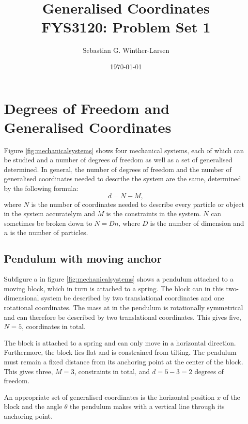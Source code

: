 \documentclass[11pt]{amsart}
\title[FYS3120: Problem Set 1]{Generalised Coordinates \\ \hrulefill\small{ FYS3120: Problem Set 1 }\hrulefill}
\author{Sebastian G. Winther-Larsen}
\date{\today}
\newcommand{\nocontentsline}[3]{}
\newcommand{\tocless}[2]{\bgroup\let\addcontentsline=\nocontentsline#1{#2}\egroup}
\begin{document}
\maketitle

\tableofcontents

\section{Degrees of Freedom and Generalised Coordinates}

Figure \ref{fig:mechanicalsystems} shows four mechanical systems, each of which can be studied and a number of degrees of freedom as well as a set of generalised determined. In general, the number of degrees of freedom and the number of generalised coordinates needed to describe the system are the same, determined by the following formula:
\begin{equation}
\label{eq:dof}
d = N - M,
\end{equation}
where $N$ is the number of coordinates needed to describe every particle or object in the system accuratelym and $M$ is the constraints in the system. $N$ can sometimes be broken down to $N = Dn$, where $D$ is the number of dimension and $n$ is the number of particles.

\tocless\subsection{Pendulum with moving anchor}
Subfigure a in figure \ref{fig:mechanicalsystems} shows a pendulum attached to a moving block, which in turn is attached to a spring. The block can in this two-dimensional system be described by two translational coordinates and one rotational coordinates. The mass at in the pendulum is rotationally symmetrical and can therefore be described by two translational coordinates. This gives five, $N=5$, coordinates in total. 

The block is attached to a spring and can only move in a horizontal direction. Furthermore, the block lies flat and is constrained from tilting. The pendulum must remain a fixed distance from its anchoring point at the center of the block. This gives three, $M=3$, constraints in total, and $d = 5 - 3 = 2$ degrees of freedom.

An appropriate set of generalised coordinates is the horizontal position $x$ of the block and the angle $\theta$ the pendulum makes with a vertical line through its anchoring point.
\end{document}
